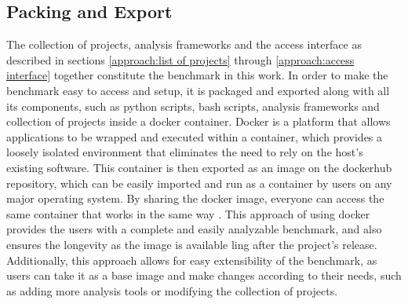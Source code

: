 \subsection{Packing and Export}
\label{approach:packing and exporting}
The collection of projects, analysis frameworks and the access interface as described in sections \ref{approach:list of projects} through \ref{approach:access interface} together constitute the benchmark in this work.
In order to make the benchmark easy to access and setup, it is packaged and exported along with all its components, such as python scripts, bash scripts, analysis frameworks and collection of projects inside a docker container.
Docker is a platform that allows applications to be wrapped and executed within a container, which provides a loosely isolated environment that eliminates the need to rely on the host's existing software.
This container is then exported as an image on the dockerhub \cite{docker_hub} repository, which can be easily imported and run as a container by users on any major operating system. 
By sharing the docker image, everyone can access the same container that works in the same way \cite{Docker_2022}.
This approach of using docker provides the users with a complete and easily analyzable benchmark, and also ensures the longevity as the image is available ling after the project's release.
Additionally, this approach allows for easy extensibility of the benchmark, as users can take it as a base image and make changes according to their needs, such as adding more analysis tools or modifying the collection of projects.
